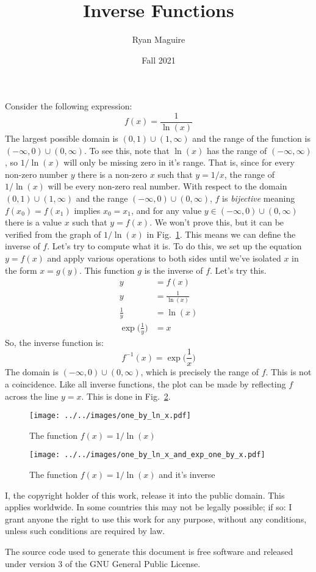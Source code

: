 \documentclass{article}
\title{Inverse Functions}
\author{Ryan Maguire}
\date{Fall 2021}
\begin{document}
    \maketitle
    Consider the following expression:
    \begin{equation}
        f(x)=\frac{1}{\ln(x)}
    \end{equation}
    The largest possible domain is $(0,1)\cup(1,\infty)$ and the range of the
    function is $(-\infty,0)\cup(0,\infty)$. To see this, note that
    $\ln(x)$ has the range of $(-\infty,\infty)$, so $1/\ln(x)$ will only be
    missing zero in it's range. That is, since for every non-zero number $y$
    there is a non-zero $x$ such that $y=1/x$, the range of $1/\ln(x)$ will be
    every non-zero real number. With respect to the domain
    $(0,1)\cup(1,\infty)$ and the range $(-\infty,0)\cup(0,\infty)$, $f$ is
    \textit{bijective} meaning $f(x_0)=f(x_{1})$ implies $x_{0}=x_{1}$,
    and for any value $y\in(-\infty,0)\cup(0,\infty)$ there is a value $x$
    such that $y=f(x)$. We won't prove this, but it can be verified from the
    graph of $1/\ln(x)$ in Fig.~\ref{fig:one_by_ln_x}. This means we can define
    the inverse of $f$. Let's try to compute what it is. To do this, we set up
    the equation $y=f(x)$ and apply various operations to both sides until
    we've isolated $x$ in the form $x=g(y)$. This function $g$ is the inverse
    of $f$. Let's try this.
    \begin{align}
        y&=f(x)\\
        y&=\frac{1}{\ln(x)}\\
        \frac{1}{y}&=\ln(x)\\
        \exp\big(\frac{1}{y}\big)&=x
    \end{align}
    So, the inverse function is:
    \begin{equation}
        f^{-1}(x)=\exp\big(\frac{1}{x}\big)
    \end{equation}
    The domain is $(-\infty,0)\cup(0,\infty)$, which is precisely the range of
    $f$. This is not a coincidence. Like all inverse functions, the plot can
    be made by reflecting $f$ across the line $y=x$. This is done in
    Fig.~\ref{fig:one_by_ln_x_and_inverse}.
    \begin{figure}
        \centering
        \texttt{[image: ../../images/one\_by\_ln\_x.pdf]}
        \caption{The function $f(x)=1/\ln(x)$}
        \label{fig:one_by_ln_x}
    \end{figure}
    \begin{figure}
        \centering
        \texttt{[image: ../../images/one\_by\_ln\_x\_and\_exp\_one\_by\_x.pdf]}
        \caption{The function $f(x)=1/\ln(x)$ and it's inverse}
        \label{fig:one_by_ln_x_and_inverse}
    \end{figure}
    \newpage
    I, the copyright holder of this work, release it into the public domain.
    This applies worldwide. In some countries this may not be legally possible;
    if so: I grant anyone the right to use this work for any purpose, without
    any conditions, unless such conditions are required by law.
    \par\hfill\par
    The source code used to generate this document is free software and released
    under version 3 of the GNU General Public License.
\end{document}

